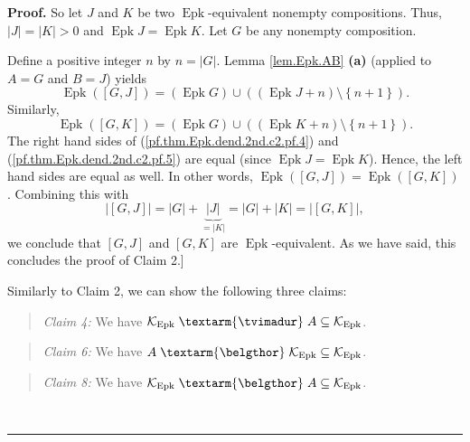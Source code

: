 \documentclass[numbers=enddot,12pt,final,onecolumn,notitlepage]{scrartcl}%
\theoremstyle{definition}
\newenvironment{statement}{\begin{quote}}{\end{quote}}
\newenvironment{proof}[1][Proof]{\noindent\textbf{#1.} }{\ \rule{0.5em}{0.5em}}
\newenvironment{verlong}{}{}
\newcommand{\tvi}{\left. \textarm{\tvimadur} \right.}
\newcommand{\bel}{\left. \textarm{\belgthor} \right.}
\begin{document}
\begin{verlong}
\begin{proof}
So let $J$ and $K$ be two $\operatorname*{Epk}$-equivalent nonempty
compositions. Thus, $\left\vert J\right\vert =\left\vert K\right\vert >0$ and
$\operatorname*{Epk}J=\operatorname*{Epk}K$.
Let $G$ be any nonempty composition.

Define a positive integer $n$ by $n=\left\vert G\right\vert $. Lemma
\ref{lem.Epk.AB} \textbf{(a)} (applied to $A=G$ and $B=J$) yields
\begin{equation}
\operatorname*{Epk}\left(  \left[  G,J\right]  \right)  =\left(
\operatorname*{Epk}G\right)  \cup\left(  \left(  \operatorname*{Epk}%
J+n\right)  \setminus\left\{  n+1\right\}  \right)  .
\label{pf.thm.Epk.dend.2nd.c2.pf.4}%
\end{equation}
Similarly,%
\begin{equation}
\operatorname*{Epk}\left(  \left[  G,K\right]  \right)  =\left(
\operatorname*{Epk}G\right)  \cup\left(  \left(  \operatorname*{Epk}%
K+n\right)  \setminus\left\{  n+1\right\}  \right)  .
\label{pf.thm.Epk.dend.2nd.c2.pf.5}%
\end{equation}
The right hand sides of (\ref{pf.thm.Epk.dend.2nd.c2.pf.4}) and
(\ref{pf.thm.Epk.dend.2nd.c2.pf.5}) are equal (since $\operatorname*{Epk}%
J=\operatorname*{Epk}K$). Hence, the left hand sides are equal as well. In
other words, $\operatorname*{Epk}\left(  \left[  G,J\right]  \right)
=\operatorname*{Epk}\left(  \left[  G,K\right]  \right)  $. Combining this
with%
\[
\left\vert \left[  G,J\right]  \right\vert =\left\vert G\right\vert
+\underbrace{\left\vert J\right\vert }_{=\left\vert K\right\vert }=\left\vert
G\right\vert +\left\vert K\right\vert =\left\vert \left[  G,K\right]
\right\vert ,
\]
we conclude that $\left[  G,J\right]  $ and $\left[  G,K\right]  $ are
$\operatorname*{Epk}$-equivalent. As we have said, this concludes the proof of
Claim 2.]

Similarly to Claim 2, we can show the following three claims:

\begin{statement}
\textit{Claim 4:} We have $\mathcal{K}_{\operatorname*{Epk}}\tvi
A\subseteq\mathcal{K}_{\operatorname*{Epk}}$.
\end{statement}

\begin{statement}
\textit{Claim 6:} We have $A\bel\mathcal{K}_{\operatorname*{Epk}}%
\subseteq\mathcal{K}_{\operatorname*{Epk}}$.
\end{statement}

\begin{statement}
\textit{Claim 8:} We have $\mathcal{K}_{\operatorname*{Epk}}\bel
A\subseteq\mathcal{K}_{\operatorname*{Epk}}$.
\end{statement}


\end{proof}
\end{verlong}
\end{document}
